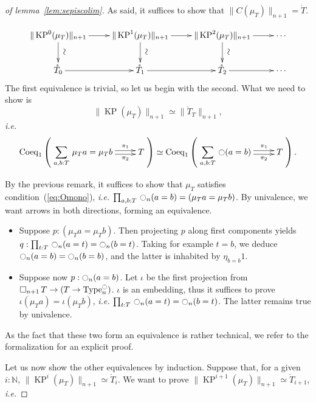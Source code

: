 \documentclass[notfinal]{jfrarticle}
\DeclareMathOperator{\Type}{Type}
\newcommand{\modal}{\ensuremath{\ocircle}}
\newcommand \separated {\mathop{\square_{n+1}} }
\newcommand{\sumD}[3]{\sum_{#1:#2}\, #3}
\newcommand{\prodD}[3]{\prod_{#1:#2}\, #3}
\DeclareMathOperator{\KP}{KP}
\newcommand{\N}{\mathbb{N}} %
\newcommand{\ie}{\emph{i.e.}}
\begin{document}
\begin{proof}[of lemma~\ref{lem:sepiscolim}]
  As said, it suffices to show that $\|C(\mu_T)\|_{n+1} =
  \mathring T$.

  \[
    \xymatrix{%
     \|\KP^0(\mu_T)\|_{n+1} \ar[r] \ar[d]^*[@]{\hbox to 0pt{\hss$\sim$\hss}}&
     \|\KP^1(\mu_T)\|_{n+1} \ar[r] \ar[d]^*[@]{\hbox to
       0pt{\hss$\sim$\hss}} & 
     \|\KP^2(\mu_T)\|_{n+1} \ar[r] \ar[d]^*[@]{\hbox to
       0pt{\hss$\sim$\hss}} & \cdots \\
     \mathring T_0 \ar[r] & \mathring T_1 \ar[r] &  \mathring T_2
     \ar[r] &\cdots
    }
  \]
  The first equivalence is trivial, so let us begin with the
  second. What we need to show is
  \[ \|\KP(\mu_T)\|_{n+1} \simeq \|\mathring T_T\|_{n+1}, \]
  \ie{}
  \[
    \mathrm{Coeq}_1 \left( 
      \xymatrix{
        \displaystyle{\sumD {a,b} T {\mu_T a = \mu_T b}} \ar@<-.5ex>[r]_-{\pi_2} \ar@<.5ex>[r]^-{\pi_1} & T
      }
    \right)
    \simeq \mathrm{Coeq}_1 \left( 
      \xymatrix{\displaystyle{\sumD {a,b} T{\modal (a=b)}} \ar@<-.5ex>[r]_-{\pi_2} \ar@<.5ex>[r]^-{\pi_1} & T}
    \right).
  \]
  
  By the previous remark, it suffices to show that $\mu_T$ satisfies condition~(\ref{eq:Omono}),
  \ie{} $\prodD {a,b} T {\modal_n (a=b) = (\mu_T a =
  \mu_T b)}$. By univalence, we want arrows in both directions, forming an
  equivalence.
  \begin{itemize}
  \item Suppose $p : (\mu_T a = \mu_T b)$. Then projecting $p$ along
    first components yields $q : \prodD t T {\modal_n(a=t)} = \modal_n (b=t)
    $.
    Taking for example $t=b$, we deduce $\modal_n (a=b) = \modal_n(b=b)$,
    and the latter is inhabited by $\eta_{b=b} 1$.
  \item Suppose now $p : \modal_n(a=b)$. Let $\iota$ be the first
    projection from $\separated T \to (T \to \Type_n^\modal)$. $\iota$ is
    an embedding, thus it suffices to prove $\iota (\mu_T a) = \iota
    (\mu_T b)$, \ie{} $\prodD t T{\modal_n (a=t) = \modal_n (b=t)}$. The latter
    remains true by univalence.
  \end{itemize}
  As the fact that these two form an equivalence is rather technical,
  we refer to the formalization for an explicit proof.


  Let us now show the other equivalences by induction. Suppose that, for a
  given $i:\N$, $\|\KP^i(\mu_T)\|_{n+1} \simeq \mathring T_i$. We want
  to prove $\|\KP^{i+1}(\mu_T)\|_{n+1} \simeq \mathring T_{i+1}$, \ie{}


\end{proof}
\end{document}
